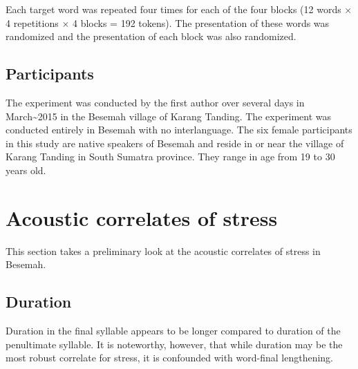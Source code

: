 \documentclass[]{article}
\newenvironment{Shaded}{\begin{snugshade}}{\end{snugshade}}
\newcommand{\KeywordTok}[1]{\textcolor[rgb]{0.13,0.29,0.53}{\textbf{#1}}}
\newcommand{\DataTypeTok}[1]{\textcolor[rgb]{0.13,0.29,0.53}{#1}}
\newcommand{\StringTok}[1]{\textcolor[rgb]{0.31,0.60,0.02}{#1}}
\newcommand{\CommentTok}[1]{\textcolor[rgb]{0.56,0.35,0.01}{\textit{#1}}}
\newcommand{\OperatorTok}[1]{\textcolor[rgb]{0.81,0.36,0.00}{\textbf{#1}}}
\newcommand{\NormalTok}[1]{#1}
\begin{document}
Each target word was repeated four times for each of the four blocks (12
words \(\times\) 4 repetitions \(\times\) 4 blocks = 192 tokens). The
presentation of these words was randomized and the presentation of each
block was also randomized.

\subsection{Participants}\label{participants}

The experiment was conducted by the first author over several days in
March\textasciitilde{}2015 in the Besemah village of Karang Tanding. The
experiment was conducted entirely in Besemah with no interlanguage. The
six female participants in this study are native speakers of Besemah and
reside in or near the village of Karang Tanding in South Sumatra
province. They range in age from 19 to 30 years old.

\section{Acoustic correlates of
stress}\label{acoustic-correlates-of-stress}

This section takes a preliminary look at the acoustic correlates of
stress in Besemah.

\subsection{Duration}\label{duration}

Duration in the final syllable appears to be longer compared to duration
of the penultimate syllable. It is noteworthy, however, that while
duration may be the most robust correlate for stress, it is confounded
with word-final lengthening.

\begin{Shaded}
\end{Shaded}
\end{document}
